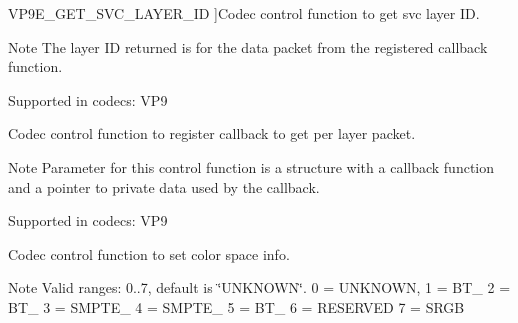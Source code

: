 \begin{Desc}
\begin{description}
{V\+P9\+E\+\_\+\+G\+E\+T\+\_\+\+S\+V\+C\+\_\+\+L\+A\+Y\+E\+R\+\_\+\+ID\hypertarget{group__vp8__encoder_gga6deae3d561c838952552c3d3756322ecae5198050ccb3c1aed11fee8a9fb3be18}{}\label{group__vp8__encoder_gga6deae3d561c838952552c3d3756322ecae5198050ccb3c1aed11fee8a9fb3be18}
}]Codec control function to get svc layer ID. \begin{DoxyNote}{Note}
The layer ID returned is for the data packet from the registered callback function.
\end{DoxyNote}
Supported in codecs\+: V\+P9 \item[{\em 
V\+P9\+E\+\_\+\+R\+E\+G\+I\+S\+T\+E\+R\+\_\+\+C\+X\+\_\+\+C\+A\+L\+L\+B\+A\+CK\hypertarget{group__vp8__encoder_gga6deae3d561c838952552c3d3756322eca4a8cf2d34935d9d7e05149fd19673dd7}{}\label{group__vp8__encoder_gga6deae3d561c838952552c3d3756322eca4a8cf2d34935d9d7e05149fd19673dd7}
}]Codec control function to register callback to get per layer packet. \begin{DoxyNote}{Note}
Parameter for this control function is a structure with a callback function and a pointer to private data used by the callback.
\end{DoxyNote}
Supported in codecs\+: V\+P9 \item[{\em 
V\+P9\+E\+\_\+\+S\+E\+T\+\_\+\+C\+O\+L\+O\+R\+\_\+\+S\+P\+A\+CE\hypertarget{group__vp8__encoder_gga6deae3d561c838952552c3d3756322ecab67a3db9b16d938513d1ee6a69b24e02}{}\label{group__vp8__encoder_gga6deae3d561c838952552c3d3756322ecab67a3db9b16d938513d1ee6a69b24e02}
}]Codec control function to set color space info. \begin{DoxyNote}{Note}
Valid ranges\+: 0..7, default is \char`\"{}\+U\+N\+K\+N\+O\+W\+N\char`\"{}. 0 = U\+N\+K\+N\+O\+WN, 1 = B\+T\+\_ 2 = B\+T\+\_ 3 = S\+M\+P\+T\+E\+\_ 4 = S\+M\+P\+T\+E\+\_ 5 = B\+T\+\_ 6 = R\+E\+S\+E\+R\+V\+ED 7 = S\+R\+GB

\end{DoxyNote}
\end{description}
\end{Desc}
